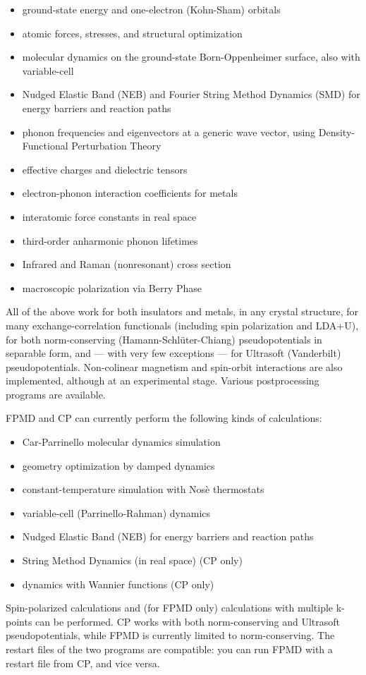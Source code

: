\documentclass[12pt,a4paper]{article}
\begin{document}
\begin{itemize}
  \item ground-state energy and one-electron (Kohn-Sham) orbitals
  \item atomic forces, stresses, and structural optimization
  \item molecular dynamics on the ground-state Born-Oppenheimer
        surface, also with variable-cell
  \item Nudged Elastic Band (NEB) and Fourier String Method Dynamics (SMD)
        for energy barriers and reaction paths
  \item phonon frequencies and eigenvectors at a generic wave vector,
        using Density-Functional Perturbation Theory
  \item effective charges and dielectric tensors
  \item electron-phonon interaction coefficients for metals
  \item interatomic force constants in real space
  \item third-order anharmonic phonon lifetimes
  \item Infrared and Raman (nonresonant) cross section
  \item macroscopic polarization via Berry Phase
\end{itemize}
All of the above work for both insulators and metals, in any crystal
structure, for many exchange-correlation functionals (including spin
polarization and LDA+U), for both norm-conserving (Hamann-Schl\"uter-Chiang)
pseudopotentials in separable form, and --- with very few exceptions
--- for Ultrasoft (Vanderbilt) pseudopotentials.  Non-colinear
magnetism and spin-orbit interactions are also implemented, although
at an experimental stage.  Various postprocessing programs are
available.

FPMD and CP can currently perform the following kinds of calculations:

\begin{itemize}
  \item Car-Parrinello molecular dynamics simulation
  \item geometry optimization by damped dynamics
  \item constant-temperature simulation with Nos\`e thermostats
  \item variable-cell (Parrinello-Rahman) dynamics
  \item Nudged Elastic Band (NEB) for energy barriers and reaction
        paths
  \item String Method Dynamics (in real space) (CP only)
  \item dynamics with Wannier functions (CP only)
\end{itemize}
Spin-polarized calculations and (for FPMD only) calculations with
multiple k-points can be performed.
CP works with both norm-conserving and Ultrasoft pseudopotentials,
while FPMD is currently limited to norm-conserving.
The restart files of the two programs are compatible: you can run FPMD
with a restart file from CP, and vice versa. 
\end{document}
